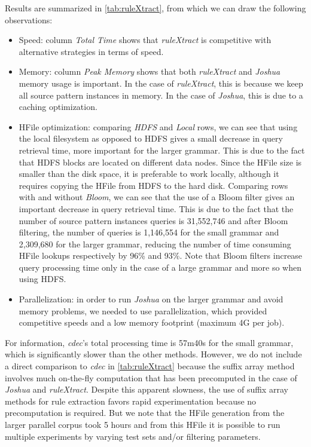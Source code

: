 Results are summarized in \autoref{tab:ruleXtract}, from which we can draw the
following observations:
%
\begin{itemize}
  \item Speed: column \emph{Total Time} shows that \emph{ruleXtract} is
    competitive with alternative strategies in terms of speed.
  \item Memory: column \emph{Peak Memory} shows that both \emph{ruleXtract} and
    \emph{Joshua} memory usage is important. In the case of \emph{ruleXtract},
    this is because we keep all source pattern instances in memory. In the case
    of \emph{Joshua}, this is due to a caching optimization.
  \item HFile optimization: comparing \emph{HDFS} and \emph{Local} rows, we can
    see that using the local filesystem as opposed to HDFS gives a small
    decrease in query retrieval time, more important for the larger grammar.
    This is due to the fact that HDFS blocks are located on different data
    nodes. Since the HFile size is smaller than the disk space, it is preferable
    to work locally, although it requires copying the HFile from HDFS to the
    hard disk. Comparing rows with and without \emph{Bloom}, we can see that the
    use of a Bloom filter gives an important decrease in query retrieval time.
    This is due to the fact that the number of source pattern instances queries
    is 31,552,746 and after Bloom filtering, the number of queries is 1,146,554
    for the small grammar and 2,309,680 for the larger grammar, reducing the
    number of time consuming HFile lookups respectively by 96\% and 93\%. Note
    that Bloom filters increase query processing time only in the case of a
    large grammar and more so when using HDFS.
  \item Parallelization: in order to run \emph{Joshua} on the larger grammar and
    avoid memory problems, we needed to use parallelization, which provided
    competitive speeds and a low memory footprint (maximum 4G per job).
\end{itemize}
%
For information, \emph{cdec}'s total processing time is 57m40s for the small
grammar, which is significantly slower than the other methods. However, we do
not include a direct comparison to \emph{cdec} in \autoref{tab:ruleXtract}
because the suffix array method involves much on-the-fly computation that has
been precomputed in the case of \emph{Joshua} and \emph{ruleXtract}. Despite
this apparent slowness, the use of suffix array methods for rule extraction
favors rapid experimentation because no precomputation is required. But we note
that the HFile generation from the larger parallel corpus took 5 hours and from
this HFile it is possible to run multiple experiments by varying test sets
and/or filtering parameters.

